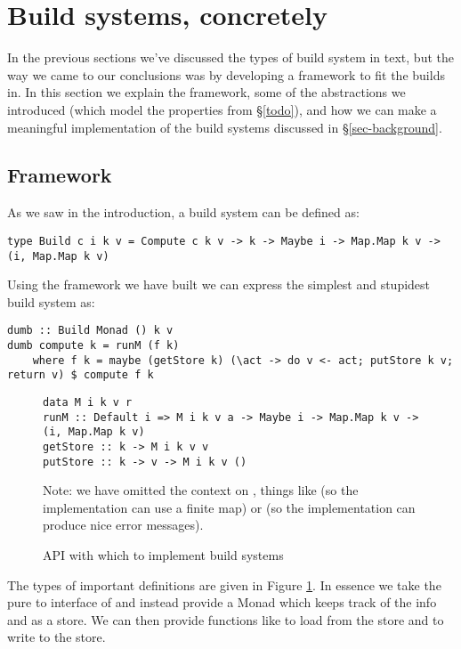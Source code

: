 \clearpage
\section{Build systems, concretely}\label{sec-examples}

In the previous sections we've discussed the types of build system in text, but the way we came to our conclusions was by developing a framework to fit the builds in. In this section we explain the framework, some of the abstractions we introduced (which model the properties from \S\ref{todo}), and how we can make a meaningful implementation of the build systems discussed in \S\ref{sec-background}.

\subsection{Framework}

As we saw in the introduction, a build system can be defined as:

\begin{verbatim}
type Build c i k v = Compute c k v -> k -> Maybe i -> Map.Map k v -> (i, Map.Map k v)
\end{verbatim}

Using the framework we have built we can express the simplest and stupidest build system as:

\begin{verbatim}
dumb :: Build Monad () k v
dumb compute k = runM (f k)
    where f k = maybe (getStore k) (\act -> do v <- act; putStore k v; return v) $ compute f k
\end{verbatim}

\begin{figure}
\begin{verbatim}
data M i k v r
runM :: Default i => M i k v a -> Maybe i -> Map.Map k v -> (i, Map.Map k v)
getStore :: k -> M i k v v
putStore :: k -> v -> M i k v ()
\end{verbatim}
Note: we have omitted the context on , things like  (so the implementation can use a finite map) or  (so the implementation can produce nice error messages).
\caption{API with which to implement build systems}
\label{fig-M-api}
\end{figure}
  
The types of important definitions are given in Figure \ref{fig-M-api}. In essence we take the pure  to  interface of  and instead provide a Monad  which keeps track of the  info and  as a store. We can then provide functions like  to load from the store and  to write to the store.

